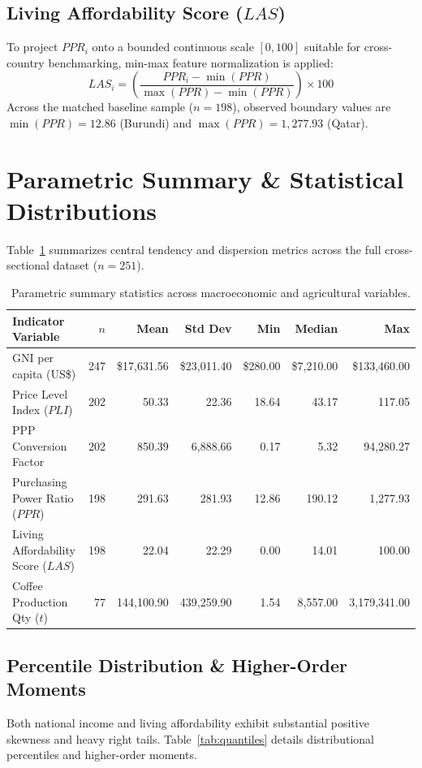 \documentclass[11pt,a4paper]{article}
\begin{document}
\subsection{Living Affordability Score ($LAS$)}
To project $PPR_i$ onto a bounded continuous scale $[0, 100]$ suitable for cross-country benchmarking, min-max feature normalization is applied:
\begin{equation}
LAS_i = \left( \frac{PPR_i - \min(PPR)}{\max(PPR) - \min(PPR)} \right) \times 100
\end{equation}
Across the matched baseline sample ($n=198$), observed boundary values are $\min(PPR) = 12.86$ (Burundi) and $\max(PPR) = 1,277.93$ (Qatar).


\section{Parametric Summary \& Statistical Distributions}


Table~\ref{tab:macro_stats} summarizes central tendency and dispersion metrics across the full cross-sectional dataset ($n=251$).

\begin{table}[h]
\centering
\small
\begin{tabular}{@{}lrrrrrr@{}}
\toprule
\textbf{Indicator Variable} & \textbf{$n$} & \textbf{Mean} & \textbf{Std Dev} & \textbf{Min} & \textbf{Median} & \textbf{Max} \\
\midrule
GNI per capita (US\$) & 247 & \$17,631.56 & \$23,011.40 & \$280.00 & \$7,210.00 & \$133,460.00 \\
Price Level Index ($PLI$) & 202 & 50.33 & 22.36 & 18.64 & 43.17 & 117.05 \\
PPP Conversion Factor & 202 & 850.39 & 6,888.66 & 0.17 & 5.32 & 94,280.27 \\
Purchasing Power Ratio ($PPR$) & 198 & 291.63 & 281.93 & 12.86 & 190.12 & 1,277.93 \\
Living Affordability Score ($LAS$) & 198 & 22.04 & 22.29 & 0.00 & 14.01 & 100.00 \\
Coffee Production Qty ($t$) & 77 & 144,100.90 & 439,259.90 & 1.54 & 8,557.00 & 3,179,341.00 \\
\bottomrule
\end{tabular}
\caption{Parametric summary statistics across macroeconomic and agricultural variables.}
\label{tab:macro_stats}
\end{table}

\subsection{Percentile Distribution \& Higher-Order Moments}
Both national income and living affordability exhibit substantial positive skewness and heavy right tails. Table~\ref{tab:quantiles} details distributional percentiles and higher-order moments.
\end{document}
